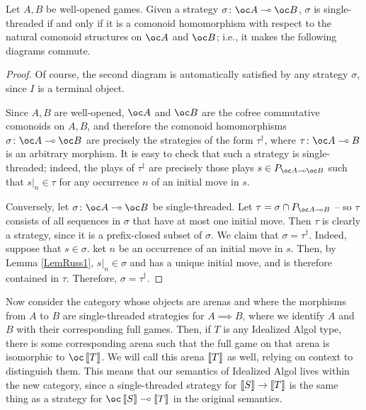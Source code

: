 \documentclass[11pt]{report}
\begin{document}
\begin{proposition}
  Let $A,B$ be well-opened games.
  Given a strategy $\sigma\from \oc A \implies \oc B$, $\sigma$ is single-threaded if and only if it is a comonoid homomorphism with respect to the natural comonoid structures on $\oc A$ and $\oc B$; i.e., it makes the following diagrams commute.
\end{proposition}
\begin{proof}
  Of course, the second diagram is automatically satisfied by any strategy $\sigma$, since $I$ is a terminal object.

  Since $A,B$ are well-opened, $\oc A$ and $\oc B$ are the cofree commutative comonoids on $A,B$, and therefore the comonoid homomorphisms $\sigma\from \oc A \implies \oc B$ are precisely the strategies of the form $\tau^\dag$, where $\tau\from\oc A \implies B$ is an arbitrary morphism.  
  It is easy to check that such a strategy is single-threaded; indeed, the plays of $\tau^\dag$ are precisely those plays $s\in P_{\oc A \implies \oc B}$ such that $s\vert_n\in\tau$ for any occurrence $n$ of an initial move in $s$.  

  Conversely, let $\sigma\from \oc A \implies \oc B$ be single-threaded.  
  Let $\tau=\sigma\cap P_{\oc A \implies B}$ -- so $\tau$ consists of all sequences in $\sigma$ that have at most one initial move.  
  Then $\tau$ is clearly a strategy, since it is a prefix-closed subset of $\sigma$.
  We claim that $\sigma=\tau^\dag$.  
  Indeed, suppose that $s\in\sigma$.  
  ket $n$ be an occurrence of an initial move in $s$.  
  Then, by Lemma \ref{LemRuss1}, $s\vert_n\in\sigma$ and has a unique initial move, and is therefore contained in $\tau$.  
  Therefore, $\sigma=\tau^\dag$.
\end{proof}

Now consider the category whose objects are arenas and where the morphisms from $A$ to $B$ are single-threaded strategies for $A\implies B$, where we identify $A$ and $B$ with their corresponding full games.  
Then, if $T$ is any Idealized Algol type, there is some corresponding arena such that the full game on that arena is isomorphic to $\oc\deno T$.  
We will call this arena $\left\llbracket T\right\rrbracket$ as well, relying on context to distinguish them.
This means that our semantics of Idealized Algol lives within the new category, since a single-threaded strategy for $\left\llbracket S\right\rrbracket \to \left\llbracket T\right\rrbracket$ is the same thing as a strategy for $\oc \deno S \implies \deno T$ in the original semantics.
\end{document}
